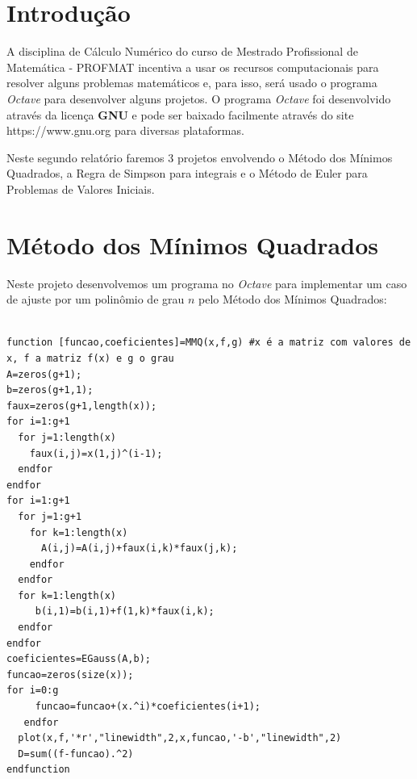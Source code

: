 \documentclass[11pt, openright, a4paper, brazil, openany, oneside]{abntex2}
\begin{document}


\frenchspacing 


\imprimircapa

\imprimirfolhaderosto*

\ABNTEXchapterfont

\tableofcontents*
\cleardoublepage
\textual

\chapter*[Introdução]{Introdução}


A disciplina de Cálculo Numérico do curso de Mestrado Profissional de Matemática - PROFMAT incentiva a usar os recursos computacionais para resolver alguns problemas matemáticos e, para isso, será usado o programa \textit{Octave} para desenvolver alguns projetos. O programa \textit{Octave} foi desenvolvido através da licença \textbf{GNU} e pode ser baixado facilmente através do site https://www.gnu.org para diversas plataformas.

Neste segundo relatório faremos 3 projetos envolvendo o Método dos Mínimos Quadrados, a Regra de Simpson para integrais e o Método de Euler para Problemas de Valores Iniciais.




\chapter{Método dos Mínimos Quadrados}

Neste projeto desenvolvemos um programa no \textit{Octave} para implementar um caso de ajuste por um polinômio de grau $n$ pelo Método dos Mínimos Quadrados: 

\begin{verbatim}

function [funcao,coeficientes]=MMQ(x,f,g) #x é a matriz com valores de x, f a matriz f(x) e g o grau
A=zeros(g+1);
b=zeros(g+1,1);
faux=zeros(g+1,length(x));
for i=1:g+1
  for j=1:length(x)
    faux(i,j)=x(1,j)^(i-1);
  endfor
endfor
for i=1:g+1
  for j=1:g+1
    for k=1:length(x)
      A(i,j)=A(i,j)+faux(i,k)*faux(j,k);
    endfor
  endfor
  for k=1:length(x)
     b(i,1)=b(i,1)+f(1,k)*faux(i,k);
  endfor
endfor
coeficientes=EGauss(A,b);
funcao=zeros(size(x));
for i=0:g
     funcao=funcao+(x.^i)*coeficientes(i+1);
   endfor
  plot(x,f,'*r',"linewidth",2,x,funcao,'-b',"linewidth",2)
  D=sum((f-funcao).^2)
endfunction

\end{verbatim}
\end{document}
